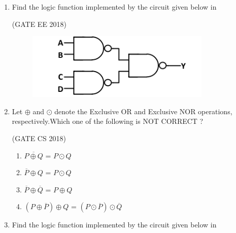 \begin{enumerate}[label=\arabic*.,ref=\theenumi]
\begin{figure}[H]
{
	}
	\caption{}
\label{fig:2016/gate/in/19}
\end{figure}


\item 
\label{prob:2018-gate-ee-14}
Find the logic function implemented by the circuit given below 
in 

\hfill (GATE EE 2018)
\begin{figure}[H]
\centering
	\includegraphics[width=0.5\columnwidth]{figs/2018-gate-ee-14.png}
\caption{}
\label{fig:2018-gate-ee-14}
\end{figure}
\item 
\label{prob:2018-gate-CS-4}		
Let $\oplus$ and $\odot$ denote the Exclusive OR and Exclusive NOR operations, respectively.Which one of the following is NOT CORRECT ?

\hfill (GATE CS 2018)
\begin{enumerate}[label=(\Alph*)]
    \item $\overline{P\oplus Q}$ = $ P \odot Q $
    \item $\overline{P} \oplus Q$ = $ P \odot Q $
    \item $\overline{P} \oplus \overline{Q}$ = $ P \oplus Q $
    \item $(P \oplus \overline{P}) \oplus Q$ = $(P \odot \overline{P}) \odot \overline{Q}$
\end{enumerate}
\item 
\label{prob:2019-gate-ee-36}
Find the logic function implemented by the circuit given below 
in 


\end{enumerate}
